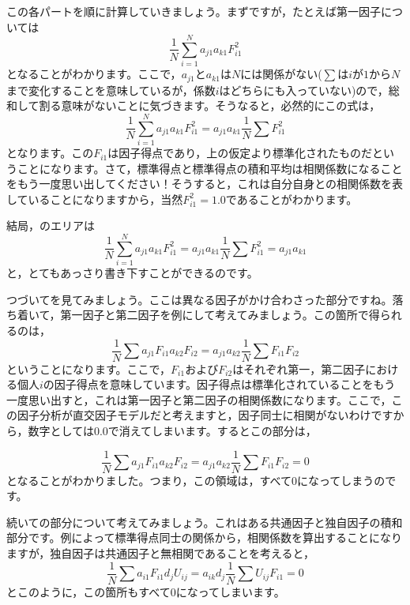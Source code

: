 \documentclass{ltjsbook}
\begin{document}
この各パートを順に計算していきましょう。まずですが，たとえば第一因子については
\begin{equation}
	\frac{1}{N}\sum_{i=1}^{N}a_{j1}a_{k1}F_{i1}^2
\end{equation}
となることがわかります。ここで，$a_{j1}$と$a_{k1}$は$N$には関係がない($\sum$は$i$が$1$から$N$まで変化することを意味しているが，係数$i$はどちらにも入っていない)ので，総和して割る意味がないことに気づきます。そうなると，必然的にこの式は，
\begin{equation}
	\frac{1}{N}\sum_{i=1}^{N}a_{j1}a_{k1}F_{i1}^2=a_{j1}a_{k1}\frac{1}{N}\sum F_{i1}^2
\end{equation}
となります。この$F_{i1}$は因子得点であり，上の仮定より標準化されたものだということになります。さて，標準得点と標準得点の積和平均は相関係数になることをもう一度思い出してください！そうすると，これは自分自身との相関係数を表していることになりますから，当然$F_{i1}^2=1.0$であることがわかります。

結局，のエリアは
\begin{equation}
	\frac{1}{N}\sum_{i=1}^{N}a_{j1}a_{k1}F_{i1}^2=a_{j1}a_{k1}\frac{1}{N}\sum F_{i1}^2=a_{j1}a_{k1}
\end{equation}
と，とてもあっさり書き下すことができるのです。

つづいてを見てみましょう。ここは異なる因子がかけ合わさった部分ですね。落ち着いて，第一因子と第二因子を例にして考えてみましょう。この箇所で得られるのは，
\begin{equation}
	\frac{1}{N}\sum a_{j1}F_{i1} a_{k2}F_{i2} = a_{j1}a_{k2}\frac{1}{N}\sum F_{i1}F_{i2}
\end{equation}
ということになります。ここで，$F_{i1}$および$F_{i2}$はそれぞれ第一，第二因子における個人$i$の因子得点を意味しています。因子得点は標準化されていることをもう一度思い出すと，これは第一因子と第二因子の相関係数になります。ここで，この因子分析が直交因子モデルだと考えますと，因子同士に相関がないわけですから，数字としては$0.0$で消えてしまいます。するとこの部分は，

\begin{equation}
	\frac{1}{N}\sum a_{j1}F_{i1} a_{k2}F_{i2} = a_{j1}a_{k2}\frac{1}{N}\sum F_{i1}F_{i2}=0
\end{equation}
となることがわかりました。つまり，この領域は，すべて$0$になってしまうのです。


続いての部分について考えてみましょう。これはある共通因子と独自因子の積和部分です。例によって標準得点同士の関係から，相関係数を算出することになりますが，独自因子は共通因子と無相関であることを考えると，
\begin{equation}
	\frac{1}{N}\sum a_{i1}F_{i1}d_{j}U_{ij}=a_{ik}d_{j} \frac{1}{N}\sum U_{ij}F_{i1} =0
\end{equation}
とこのように，この箇所もすべて$0$になってしまいます。
\end{document}
